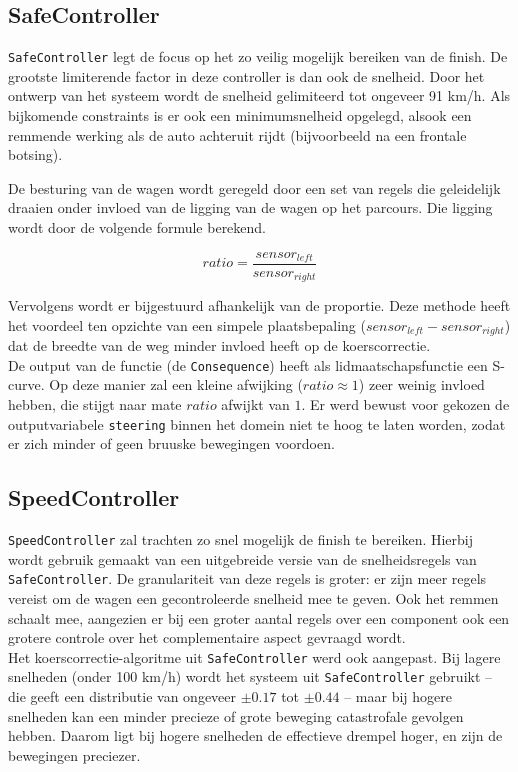 \documentclass[10pt,a4paper]{article}
\begin{document}
		\subsection{SafeController}
			\texttt{SafeController} legt de focus op het zo veilig mogelijk bereiken van de finish. De grootste limiterende factor in deze controller is dan ook de snelheid. Door het ontwerp van het systeem wordt de snelheid gelimiteerd tot ongeveer 91 km/h. Als bijkomende constraints is er ook een minimumsnelheid opgelegd, alsook een remmende werking als de auto achteruit rijdt (bijvoorbeeld na een frontale botsing).

			De besturing van de wagen wordt geregeld door een set van regels die geleidelijk draaien onder invloed van de ligging van de wagen op het parcours. Die ligging wordt door de volgende formule berekend.

			\begin{equation}
	ratio = \frac{sensor_{left}}{sensor_{right}}
			\end{equation}

			Vervolgens wordt er bijgestuurd afhankelijk van de proportie. Deze methode heeft het voordeel ten opzichte van een simpele plaatsbepaling ($sensor_{left} - sensor_{right}$) dat de breedte van de weg minder invloed heeft op de koerscorrectie.\\
			De output van de functie (de \texttt{Consequence}) heeft als lidmaatschapsfunctie een S-curve. Op deze manier zal een kleine afwijking ($ratio \approx 1$) zeer weinig invloed hebben, die stijgt naar mate $ratio$ afwijkt van $1$. Er werd bewust voor gekozen de outputvariabele \texttt{steering} binnen het domein niet te hoog te laten worden, zodat er zich minder of geen bruuske bewegingen voordoen.

		\subsection{SpeedController}
			\texttt{SpeedController} zal trachten zo snel mogelijk de finish te bereiken. Hierbij wordt gebruik gemaakt van een uitgebreide versie van de snelheidsregels van \texttt{SafeController}. De granulariteit van deze regels is groter: er zijn meer regels vereist om de wagen een gecontroleerde snelheid mee te geven. Ook het remmen schaalt mee, aangezien er bij een groter aantal regels over een component ook een grotere controle over het complementaire aspect gevraagd wordt.\\

			Het koerscorrectie-algoritme uit \texttt{SafeController} werd ook aangepast. Bij lagere snelheden (onder 100 km/h) wordt het systeem uit \texttt{SafeController} gebruikt -- die geeft een distributie van ongeveer $\pm 0.17$ tot $\pm 0.44$ -- maar bij hogere snelheden kan een minder precieze of grote beweging catastrofale gevolgen hebben. Daarom ligt bij hogere snelheden de effectieve drempel hoger, en zijn de bewegingen preciezer.\\
\end{document}
